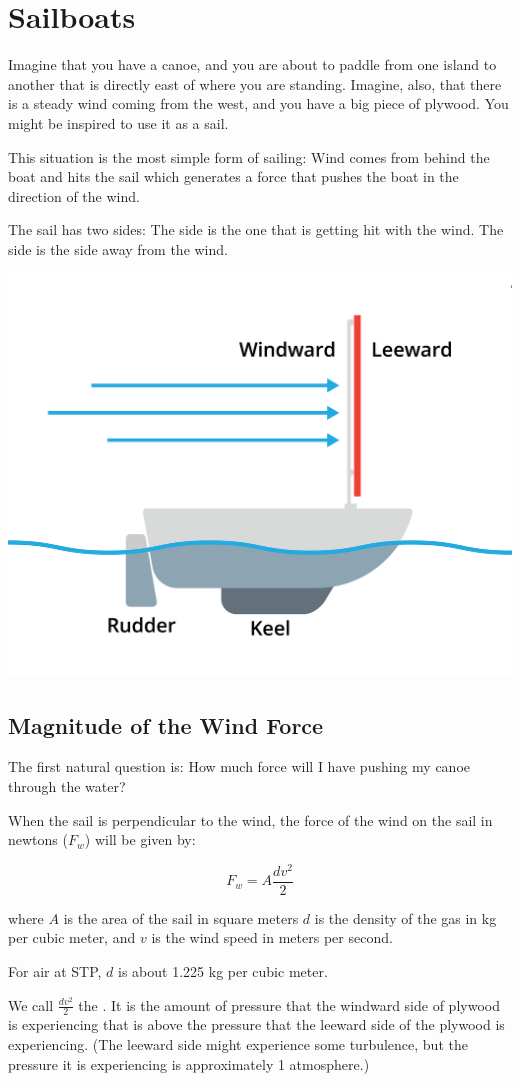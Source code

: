 \chapter{Sailboats}

Imagine that you have a canoe, and you are about to paddle from one island to another that is directly east of where you are standing.  Imagine, also, that there 
is a steady wind coming from the west, and you have a big piece of plywood.  You might be inspired to use it as a sail.

This situation is the most simple form of sailing: Wind comes from behind the boat and hits the sail which generates a force that pushes the 
boat in the direction of the wind.

The sail has two sides:  The  side is the one that is getting hit with the wind.  The  side is the side away from the wind.

\includegraphics[width=.75\textwidth]{plywood.png}


\section{Magnitude of the Wind Force}

The first natural question is: How much force will I have pushing my canoe through the water?

\begin{mdframed}[style=important, frametitle={Wind Force}]

When the sail is perpendicular to the wind,  the force of the wind on the sail in newtons ($F_w$) will be given by:

$$F_w = A \frac{d v^2}{2}$$

where $A$ is the area of the sail in square meters  $d$ is the density of the gas in kg per cubic meter, and $v$ is the wind speed in meters per second.

For air at STP,  $d$ is about 1.225 kg per cubic meter.

We call $\frac{d v^2}{2}$  the .   It is the amount of pressure that the windward side of plywood is experiencing that is above the 
 pressure that the leeward side of the plywood is experiencing.  (The leeward side might experience some turbulence,  but the pressure it is experiencing is 
 approximately 1 atmosphere.)

\end{mdframed}

